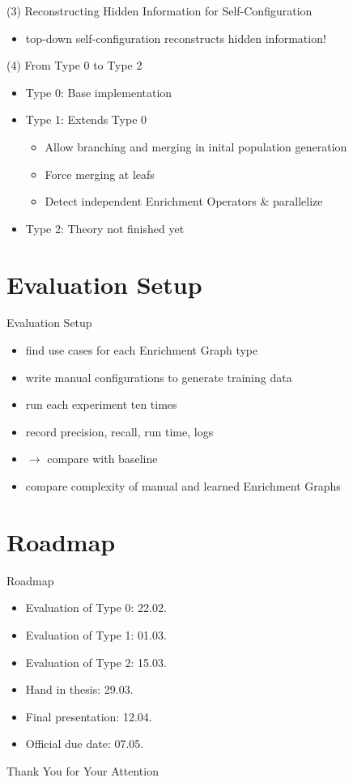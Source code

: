 \documentclass[aspectratio=1610]{beamer}
\begin{document}
\begin{frame}{(3) Reconstructing Hidden Information for Self-Configuration}
    \begin{itemize}
      \item top-down self-configuration reconstructs hidden information!
    \end{itemize}
\end{frame}

\begin{frame}{(4) From Type 0 to Type 2}
\begin{itemize}
  \item Type 0: Base implementation
  \item Type 1: Extends Type 0
    \begin{itemize}
      \item Allow branching and merging in inital population generation
      \item Force merging at leafs
      \item Detect independent Enrichment Operators \& parallelize
    \end{itemize}
  \item Type 2: Theory not finished yet
\end{itemize}
\end{frame}

\section{Evaluation Setup}
\begin{frame}{Evaluation Setup}
\begin{itemize}
  \item find use cases for each Enrichment Graph type
  \item write manual configurations to generate training data
  \item run each experiment ten times
  \item record precision, recall, run time, logs
  \item $\to$ compare with baseline
  \item compare complexity of manual and learned Enrichment Graphs
\end{itemize}
\end{frame}

\section{Roadmap}
\begin{frame}{Roadmap}
\begin{itemize}
  \item Evaluation of Type 0: 22.02.
  \item Evaluation of Type 1: 01.03.
  \item Evaluation of Type 2: 15.03.
  \item Hand in thesis: 29.03.
  \item Final presentation: 12.04.
  \item Official due date: 07.05.
\end{itemize}
\end{frame}

\begin{frame}{Thank You for Your Attention}

\end{frame}
\end{document}
